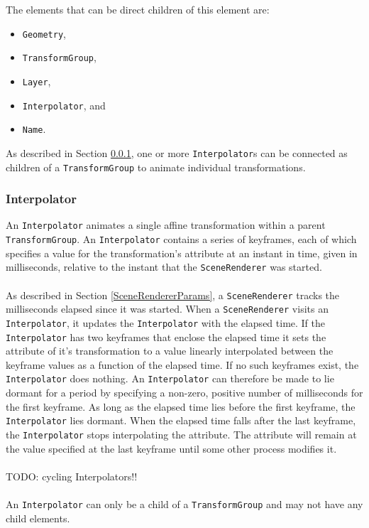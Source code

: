 \documentclass[10pt,aps, prb,preprint]{article}
\begin{document}
The elements that can be direct children of this element are:
\begin{itemize}
\item \texttt{Geometry},
\item \texttt{TransformGroup},
\item \texttt{Layer},
\item \texttt{Interpolator}, and
\item \texttt{Name}.
\end{itemize}
As described in Section \ref{interpolator}, one or more \texttt{Interpolator}s can be connected as children of a \texttt{TransformGroup} to animate individual transformations.




\subsubsection{Interpolator}
\label{interpolator}
An \texttt{Interpolator} animates a single affine transformation within a parent \texttt{TransformGroup}.  An \texttt{Interpolator} contains a series of keyframes, each of which specifies a value for the transformation's attribute at an instant in time, given in milliseconds, relative to the instant that the \texttt{SceneRenderer} was started. 
\\
\\
As described in Section \ref{SceneRendererParams}, a \texttt{SceneRenderer} tracks the milliseconds elapsed since it was started. When a \texttt{SceneRenderer} visits an \texttt{Interpolator}, it updates the \texttt{Interpolator} with the elapsed time. If the \texttt{Interpolator} has two keyframes that enclose the elapsed time it sets the attribute of it's transformation to a value linearly interpolated between the keyframe values as a function of the elapsed time. If no such keyframes exist, the \texttt{Interpolator} does nothing. An \texttt{Interpolator} can therefore be made to lie dormant for a period by specifying a non-zero, positive number of milliseconds for the first keyframe. As long as the elapsed time lies before the first keyframe, the \texttt{Interpolator} lies dormant. When the elapsed time falls after the last keyframe, the \texttt{Interpolator} stops interpolating the attribute. The attribute will remain at the value specified at the last keyframe until some other process modifies it.
\\
\\
TODO: cycling Interpolators!!
\\
\\
An \texttt{Interpolator} can only be a child of a \texttt{TransformGroup} and may not have any child elements.
\end{document}

